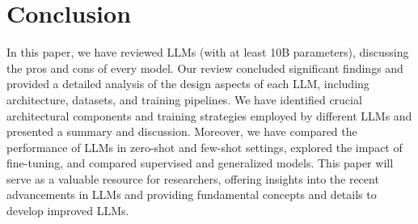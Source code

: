\section{Conclusion}
In this paper, we have reviewed LLMs (with at least 10B parameters), discussing the pros and cons of every model. Our review concluded significant findings and provided a detailed analysis of the design aspects of each LLM, including architecture, datasets, and training pipelines. We have identified crucial architectural components and training strategies employed by different LLMs and presented a summary and discussion. Moreover, we have compared the performance of LLMs in zero-shot and few-shot settings, explored the impact of fine-tuning, and compared supervised and generalized models. This paper will serve as a valuable resource for researchers, offering insights into the recent advancements in LLMs and providing fundamental concepts and details to develop improved LLMs.

